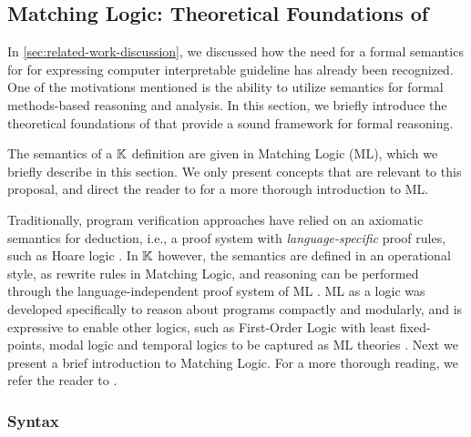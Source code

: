 \subsection{Matching Logic: Theoretical Foundations of
\K{}}\label{sec:theoretical-foundations}

In \autoref{sec:related-work-discussion}, we discussed how
the need for a formal semantics for \DSLs{} for expressing
computer interpretable guideline has already been recognized.
One of the motivations mentioned is the ability to utilize
semantics for formal methods-based reasoning and analysis.
In this section, we briefly introduce the theoretical foundations
of \K{} that provide a sound framework for formal reasoning.

The semantics of a $\mathbb{K}$ definition are given in
Matching Logic (ML), which we briefly
describe in this section. We only present concepts that are
relevant to this proposal, and direct the reader to \cite{RosuLMCS17,ChenLICS19}
for a more thorough introduction to ML.

Traditionally, program verification approaches have
relied on an axiomatic semantics for deduction, i.e., a proof system with
\emph{language-specific} proof rules, such as Hoare logic \cite{HoareACM69}.
In $\mathbb{K}$ however, the semantics are defined in an operational style, as
rewrite rules in Matching Logic, and reasoning can be performed through
the language-independent proof system of ML \cite{MatchingLogicUrl}.
ML as a logic was developed specifically to reason about programs
compactly and modularly, and is expressive to enable other logics,
such as First-Order Logic with least fixed-points, modal logic and temporal
logics to be captured as ML theories \cite{RosuLMCS17,ChenLICS19,ChenTR20,ChenICFP20}.
Next we present a brief introduction to Matching Logic. For a more
thorough reading, we refer the reader to \cite{ChenTR20}.

\subsubsection{Syntax}

